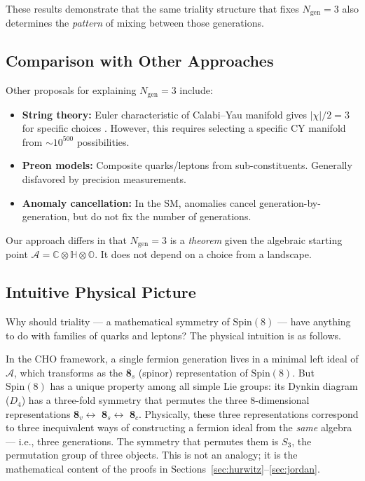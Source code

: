 \documentclass[12pt,a4paper]{article}
\theoremstyle{definition}
\theoremstyle{remark}
\newcommand{\Oct}{\mathbb{O}}
\newcommand{\Quat}{\mathbb{H}}
\newcommand{\Comp}{\mathbb{C}}
\newcommand{\Alg}{\mathcal{A}}
\newcommand{\Spin}{\mathrm{Spin}}
\begin{document}
These results demonstrate that the same triality structure that fixes 
$N_{\mathrm{gen}} = 3$ also determines the \emph{pattern} of mixing between 
those generations.

\subsection{Comparison with Other Approaches}

Other proposals for explaining $N_{\mathrm{gen}} = 3$ include:
\begin{itemize}
\item \textbf{String theory:} Euler characteristic of Calabi--Yau manifold gives 
$|\chi|/2 = 3$ for specific choices \cite{CHSW1985}. However, this requires 
selecting a specific CY manifold from $\sim 10^{500}$ possibilities.
\item \textbf{Preon models:} Composite quarks/leptons from sub-constituents. 
Generally disfavored by precision measurements.
\item \textbf{Anomaly cancellation:} In the SM, anomalies cancel generation-by-generation, but do not fix the number of generations.
\end{itemize}

Our approach differs in that $N_{\mathrm{gen}} = 3$ is a \emph{theorem} given 
the algebraic starting point $\Alg = \Comp \otimes \Quat \otimes \Oct$. It 
does not depend on a choice from a landscape.

\subsection{Intuitive Physical Picture}

Why should triality --- a mathematical symmetry of $\Spin(8)$ --- have 
anything to do with families of quarks and leptons? The physical intuition 
is as follows.

In the CHO framework, a single fermion generation lives in a minimal left 
ideal of $\Alg$, which transforms as the \textbf{8}$_s$ (spinor) 
representation of $\Spin(8)$. But $\Spin(8)$ has a unique property among 
all simple Lie groups: its Dynkin diagram ($D_4$) has a three-fold symmetry 
that permutes the three 8-dimensional representations 
\textbf{8}$_v \leftrightarrow$ \textbf{8}$_s \leftrightarrow$ \textbf{8}$_c$. 
Physically, these three representations correspond to three inequivalent ways 
of constructing a fermion ideal from the \emph{same} algebra --- i.e., three 
generations. The symmetry that permutes them is $S_3$, the permutation group 
of three objects. This is not an analogy; it is the mathematical content of 
the proofs in Sections~\ref{sec:hurwitz}--\ref{sec:jordan}.
\end{document}
